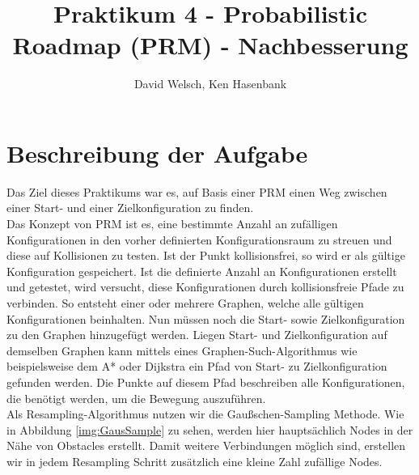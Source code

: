 \documentclass[a4paper]{scrartcl}
\begin{document}
\titlehead{Wintersemester 2017/2018\\Motion Planning\\Prof. Horsch, Rudi Scheitler}
\author{David Welsch, Ken Hasenbank}
\title{Praktikum 4 - Probabilistic Roadmap (PRM) - Nachbesserung}
\maketitle

\section*{Beschreibung der Aufgabe}

Das Ziel dieses Praktikums war es, auf Basis einer PRM einen Weg zwischen einer Start- und einer Zielkonfiguration zu finden. \\

Das Konzept von PRM ist es, eine bestimmte Anzahl an zufälligen Konfigurationen in den vorher definierten Konfigurationsraum zu streuen und diese auf Kollisionen zu testen. Ist der Punkt kollisionsfrei, so wird er als gültige Konfiguration gespeichert. Ist die definierte Anzahl an Konfigurationen erstellt und getestet, wird versucht, diese Konfigurationen durch kollisionsfreie Pfade zu verbinden. So entsteht einer oder mehrere Graphen, welche alle gültigen Konfigurationen beinhalten. Nun müssen noch die Start- sowie  Zielkonfiguration zu den Graphen hinzugefügt werden. Liegen Start- und Zielkonfiguration auf demselben Graphen kann mittels eines Graphen-Such-Algorithmus wie beispielsweise dem A* oder Dijkstra ein Pfad von Start- zu Zielkonfiguration gefunden werden. Die Punkte auf diesem Pfad beschreiben alle Konfigurationen, die benötigt werden, um die Bewegung auszuführen.\\

Als Resampling-Algorithmus nutzen wir die Gaußschen-Sampling Methode. Wie in Abbildung \ref{img:GausSample} zu sehen, werden hier hauptsächlich Nodes in der Nähe von Obstacles erstellt. Damit weitere Verbindungen möglich sind, erstellen wir in jedem Resampling Schritt zusätzlich eine kleine Zahl zufällige Nodes.\\
\end{document}
